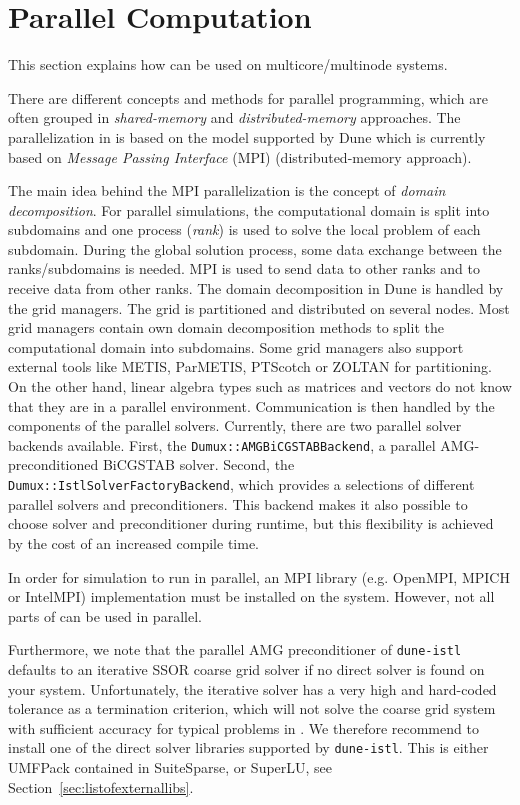 \section{Parallel Computation}
\label{sec:parallelcomputation}
This section explains how \Dumux can be used
on multicore/multinode systems.

There are different concepts and methods for parallel programming, which are
often grouped in \textit{shared-memory} and \textit{distributed-memory}
approaches. The parallelization in \Dumux is based on the model supported by Dune which is currently based on
\textit{Message Passing Interface} (MPI) (distributed-memory approach).

The main idea behind the MPI parallelization is the concept of \textit{domain
decomposition}. For parallel simulations, the computational domain is split into
subdomains and one process (\textit{rank}) is used to solve the local problem of each
subdomain. During the global solution process, some data exchange between the
ranks/subdomains is needed. MPI is used to send data to other ranks and to receive
data from other ranks. The domain decomposition in Dune is handled by the grid managers.
The grid is partitioned and distributed on several nodes. Most grid managers contain own domain decomposition methods to split the
computational domain  into subdomains. Some grid managers also support external
tools like METIS, ParMETIS, PTScotch or ZOLTAN for partitioning.
On the other hand, linear algebra types such as matrices and vectors
do not know that they are in a parallel environment. Communication is then handled by the components of the
parallel solvers. Currently, there are two parallel solver backends available.
First, the \texttt{Dumux::AMGBiCGSTABBackend}, a parallel AMG-preconditioned BiCGSTAB solver.
Second, the \texttt{Dumux::IstlSolverFactoryBackend}, which provides a selections of different parallel solvers and preconditioners.
This backend makes it also possible to choose solver and preconditioner during runtime,
but this flexibility is achieved by the cost of an increased compile time.

In order for \Dumux simulation to run in parallel, an
MPI library (e.g. OpenMPI, MPICH or IntelMPI) implementation
must be installed on the system.
However, not all parts of \Dumux can be used in parallel.

Furthermore, we note that the parallel AMG preconditioner of \texttt{dune-istl}
defaults to an iterative SSOR coarse grid solver if no direct solver is found on your system. Unfortunately,
the iterative solver has a very high and hard-coded tolerance as a termination criterion, which will not solve
the coarse grid system with sufficient accuracy for typical problems in \Dumux. We therefore recommend
to install one of the direct solver libraries supported by \texttt{dune-istl}. This is either UMFPack contained
in SuiteSparse, or SuperLU, see Section~\ref{sec:listofexternallibs}.

